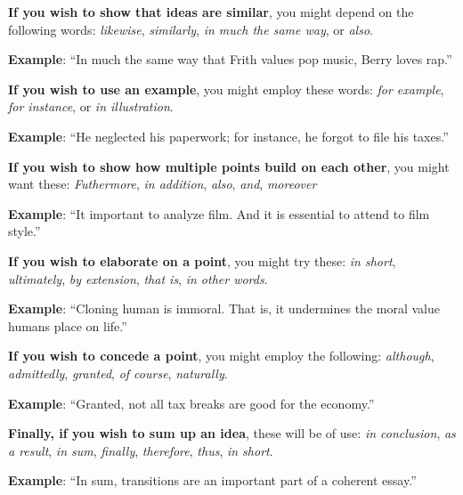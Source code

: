 \textbf{If you wish to show that ideas are similar}, you might depend on the following words: \emph{likewise}, \emph{similarly}, \emph{in much the same way}, or \emph{also}.

\tab \textbf{Example}:  ``In much the same way that Frith values pop music, Berry loves rap.''      

\textbf{If you wish to use an example}, you might employ these words: \emph{for example}, \emph{for instance}, or \emph{in illustration}.

\tab \textbf{Example}: ``He neglected his paperwork; for instance, he forgot to file his taxes.''

\textbf{If you wish to show how multiple points build on each other}, you might want these: \emph{Futhermore}, \emph{in addition}, \emph{also}, \emph{and}, \emph{moreover}

\tab \textbf{Example}: ``It important to analyze film.  And it is essential to attend to film style.''

\textbf{If you wish to elaborate on a point}, you might try these: \emph{in short}, \emph{ultimately}, \emph{by extension}, \emph{that is}, \emph{in other words}.

\tab \textbf{Example}: ``Cloning human is immoral. That is, it undermines the moral value humans place on life.''
        
\textbf{If you wish to concede a point}, you might employ the following: \emph{although}, \emph{admittedly}, \emph{granted}, \emph{of course}, \emph{naturally}.

\tab \textbf{Example}: ``Granted, not all tax breaks are good for the economy.''
        	
\textbf{Finally, if you wish to sum up an idea}, these will be of use: \emph{in conclusion}, \emph{as a result}, \emph{in sum}, \emph{finally}, \emph{therefore}, \emph{thus}, \emph{in short}.

\tab \textbf{Example}: ``In sum, transitions are an important part of a coherent essay.''

